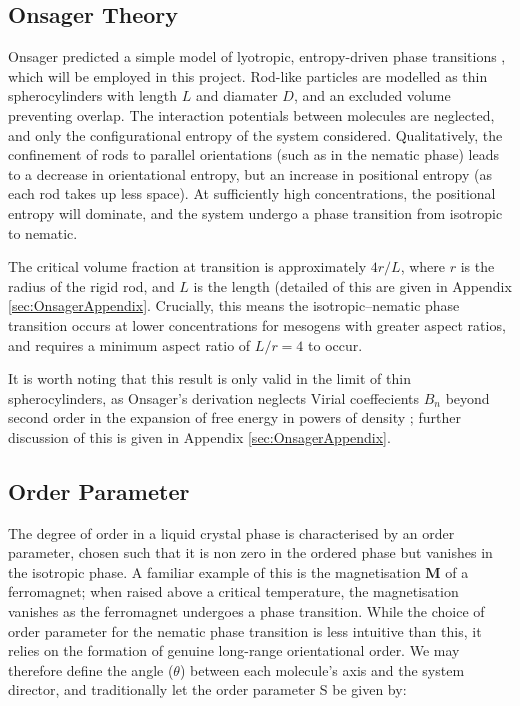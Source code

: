 \documentclass[11pt, a4paper]{article} %
\begin{document}
\subsection{Onsager Theory} \label{sec:OnsagerTheory}

Onsager predicted a simple model of lyotropic, entropy-driven phase transitions \cite{Onsager1949}, which will be employed in this project. Rod-like particles are modelled as thin spherocylinders with length $L$ and diamater $D$, and an excluded volume preventing overlap. The interaction potentials between molecules are neglected, and only the configurational entropy of the system considered. Qualitatively, the confinement of rods to parallel orientations (such as in the nematic phase) leads to a decrease in orientational entropy, but an increase in positional entropy (as each rod takes up less space). At sufficiently high concentrations, the positional entropy will dominate, and the system undergo a phase transition from isotropic to nematic. 

The critical volume fraction at transition is approximately $4r/L$, where $r$ is the radius of the rigid rod, and $L$ is the length (detailed of this are given in Appendix \ref{sec:OnsagerAppendix}. Crucially, this means the isotropic--nematic phase transition occurs at lower concentrations for mesogens with greater aspect ratios, and requires a minimum aspect ratio of $L/r = 4$ to occur.

It is worth noting that this result is only valid in the limit of thin spherocylinders, as Onsager's derivation neglects Virial coeffecients $B_{n}$ beyond second order in the expansion of free energy in powers of density \cite{Frenkel1987}; further discussion of this is given in Appendix \ref{sec:OnsagerAppendix}.

\subsection{Order Parameter}

The degree of order in a liquid crystal phase is characterised by an order parameter, chosen such that it is non zero in the ordered phase but vanishes in the isotropic phase. A familiar example of this is the magnetisation $\textbf{M}$ of a ferromagnet; when raised above a critical temperature, the magnetisation vanishes as the ferromagnet undergoes a phase transition. While the choice of order parameter for the nematic phase transition is less intuitive than this, it relies on the formation of genuine long-range orientational order. We may therefore define the angle ($\theta$) between each molecule's axis and the system director, and traditionally let the order parameter S be given by:
\end{document}
